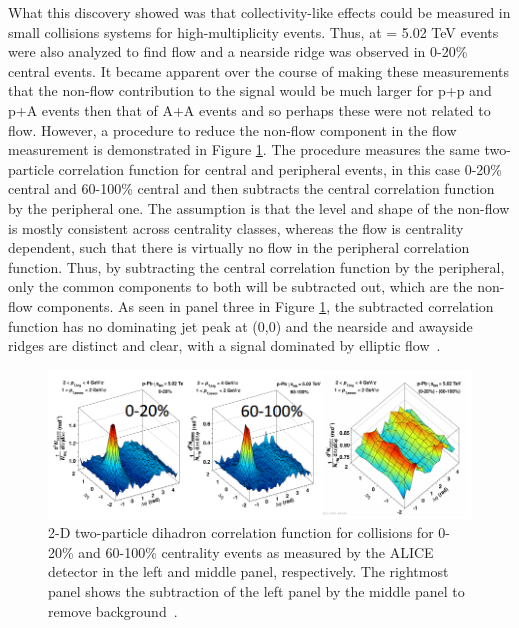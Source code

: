 What this discovery showed was that collectivity-like effects could be measured in small collisions systems for high-multiplicity events. Thus, \ppb at \sqsn = 5.02 TeV events were also analyzed to find flow and a nearside ridge was observed in 0-20\% central events. It became apparent over the course of making these measurements that the non-flow contribution to the signal would be much larger for p+p and p+A events then that of A+A events and so perhaps these were not related to flow. However, a procedure to reduce the non-flow component in the flow measurement is demonstrated in Figure \ref{fig:pPb_ridge_subtraction}. The procedure measures the same two-particle correlation function for central and peripheral events, in this case 0-20\% central and 60-100\% central and then subtracts the central correlation function by the peripheral one. The assumption is that the level and shape of the non-flow is mostly consistent across centrality classes, whereas the flow is centrality dependent, such that there is virtually no flow in the peripheral correlation function. Thus, by subtracting the central correlation function by the peripheral, only the common components to both will be subtracted out, which are the non-flow components. As seen in panel three in Figure \ref{fig:pPb_ridge_subtraction}, the subtracted correlation function has no dominating jet peak at (0,0) and the nearside and awayside ridges are distinct and clear, with a signal dominated by elliptic flow~\cite{Abelev2013164}.

\begin{figure}[h!]
\begin{center}
\includegraphics[width=0.85\linewidth]{figs/pPb_subtraction_correlation.PNG}
\caption{ 2-D two-particle dihadron correlation function for \ppb collisions for 0-20\% and 60-100\% centrality events as measured by the ALICE detector in the left and middle panel, respectively. The rightmost panel shows the subtraction of the left panel by the middle panel to remove background~\cite{Abelev2013164}.}
\label{fig:pPb_ridge_subtraction}
\end{center}
\end{figure}

